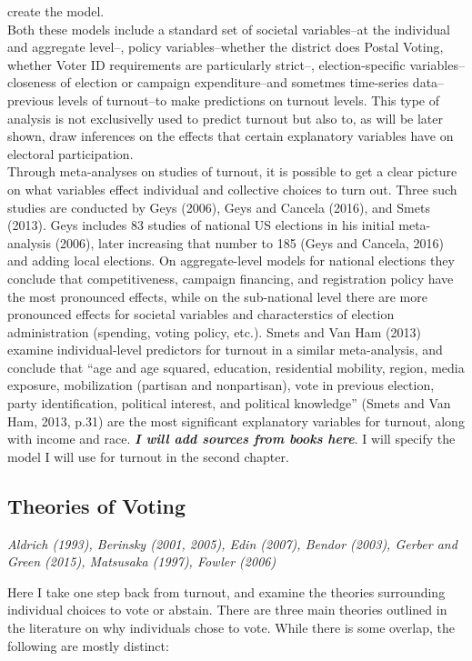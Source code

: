 \documentclass[12pt,twoside]{reedthesis}
\begin{document}
  create the model.\\
  Both these models include a standard set of societal variables--at the
  individual and aggregate level--, policy variables--whether the district
  does Postal Voting, whether Voter ID requirements are particularly
  strict--, election-specific variables--closeness of election or campaign
  expenditure--and sometmes time-series data--previous levels of
  turnout--to make predictions on turnout levels. This type of analysis is
  not exclusivelly used to predict turnout but also to, as will be later
  shown, draw inferences on the effects that certain explanatory variables
  have on electoral participation.\\
  Through meta-analyses on studies of turnout, it is possible to get a
  clear picture on what variables effect individual and collective choices
  to turn out. Three such studies are conducted by Geys (2006), Geys and
  Cancela (2016), and Smets (2013). Geys includes 83 studies of national
  US elections in his initial meta-analysis (2006), later increasing that
  number to 185 (Geys and Cancela, 2016) and adding local elections. On
  aggregate-level models for national elections they conclude that
  competitiveness, campaign financing, and registration policy have the
  most pronounced effects, while on the sub-national level there are more
  pronounced effects for societal variables and characterstics of election
  administration (spending, voting policy, etc.). Smets and Van Ham (2013)
  examine individual-level predictors for turnout in a similar
  meta-analysis, and conclude that ``age and age squared, education,
  residential mobility, region, media exposure, mobilization (partisan and
  nonpartisan), vote in previous election, party identification, political
  interest, and political knowledge'' (Smets and Van Ham, 2013, p.31) are
  the most significant explanatory variables for turnout, along with
  income and race. \textbf{\emph{I will add sources from books here}}. I
  will specify the model I will use for turnout in the second chapter.
  
  \subsection{Theories of Voting}\label{theories-of-voting}
  
  \emph{Aldrich (1993), Berinsky (2001, 2005), Edin (2007), Bendor (2003),
  Gerber and Green (2015), Matsusaka (1997), Fowler (2006)}
  
  Here I take one step back from turnout, and examine the theories
  surrounding individual choices to vote or abstain. There are three main
  theories outlined in the literature on why individuals chose to vote.
  While there is some overlap, the following are mostly distinct:
  
\end{document}
